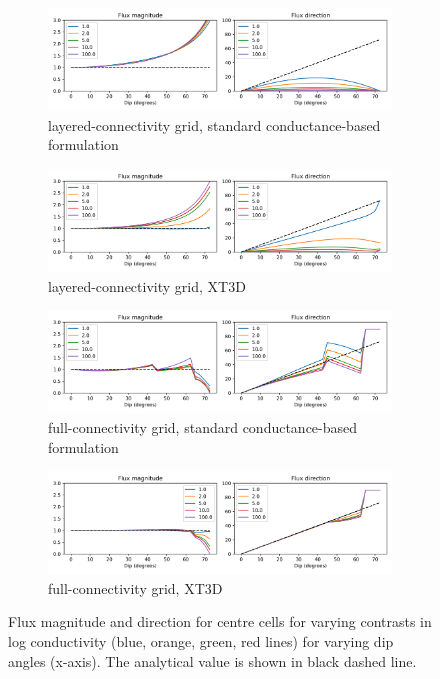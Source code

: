 \documentclass{article}
\begin{document}
\begin{figure}[p!]
\centering
\begin{subfigure}{0.9\textwidth}
	\includegraphics[width=\textwidth]{../figures/fig4_0_paper.png}
	\caption{layered-connectivity grid, standard conductance-based formulation}
	\label{fig:fig4a}
\end{subfigure}
\begin{subfigure}{0.9\textwidth}
	\includegraphics[width=\textwidth]{../figures/fig4_1_paper.png}
	\caption{layered-connectivity grid, XT3D}
	\label{fig:fig4b}
\end{subfigure}
\begin{subfigure}{0.9\textwidth}
	\includegraphics[width=\textwidth]{../figures/fig4_2_paper.png}
	\caption{full-connectivity grid, standard conductance-based formulation}
	\label{fig:fig4c}
\end{subfigure}
\begin{subfigure}{0.9\textwidth}
	\includegraphics[width=\textwidth]{../figures/fig4_3_paper.png}
	\caption{full-connectivity grid, XT3D}
	\label{fig:fig4d}
\end{subfigure}

\caption{Flux magnitude and direction for centre cells for varying contrasts in log conductivity (blue, orange, green, red lines) for varying dip angles (x-axis). The analytical value is shown in black dashed line.}
\label{fig:figures}
\end{figure}
\end{document}
